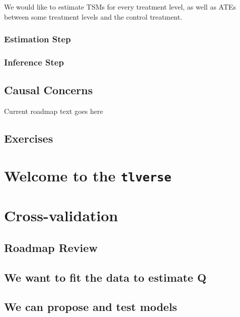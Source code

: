 \documentclass[
  12pt, krantz2,
]{krantz}
\theoremstyle{definition}
\theoremstyle{definition}
\theoremstyle{definition}
\newcommand{\1}{\mathbbm{1}}
\begin{document}
We would like to estimate TSMs for every treatment level, as well as ATEs between some treatment levels and the control treatment.

\hypertarget{estimation-step-1}{%
\subsection{Estimation Step}\label{estimation-step-1}}

\hypertarget{inference-step-1}{%
\subsection{Inference Step}\label{inference-step-1}}

\hypertarget{causal-concerns}{%
\section{Causal Concerns}\label{causal-concerns}}

Current roadmap text goes here

\hypertarget{exercises}{%
\section{Exercises}\label{exercises}}

\hypertarget{tlverse}{%
\chapter{\texorpdfstring{Welcome to the \texttt{tlverse}}{Welcome to the tlverse}}\label{tlverse}}

\hypertarget{origami}{%
\chapter{Cross-validation}\label{origami}}

\hypertarget{roadmap-review}{%
\section{Roadmap Review}\label{roadmap-review}}

\hypertarget{we-want-to-fit-the-data-to-estimate-q}{%
\section{We want to fit the data to estimate Q}\label{we-want-to-fit-the-data-to-estimate-q}}

\hypertarget{we-can-propose-and-test-models}{%
\section{We can propose and test models}\label{we-can-propose-and-test-models}}
\end{document}

